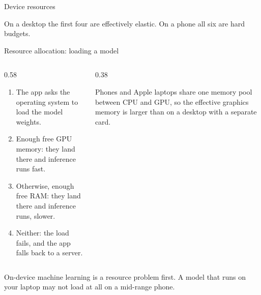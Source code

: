 \documentclass[10pt,aspectratio=169,t]{beamer}
\begin{document}
\begin{frame}[eyebrow=Device spectrum]{Device resources}
  \vskip 1mm
  \begin{grid}[3]
  \end{grid}
  \begin{takeaway}{On a desktop the first four are effectively elastic.}
    On a phone all six are hard budgets.
  \end{takeaway}
\end{frame}

\begin{frame}[eyebrow=Device spectrum]{Resource allocation: loading a model}
  \vskip 2mm
  \begin{columns}[T]
    \begin{column}{0.58\textwidth}
      \begin{enumerate}
        \item The app asks the operating system to load the model weights.
        \item Enough free GPU memory: they land there and inference runs fast.
        \item Otherwise, enough free RAM: they land there and inference runs, slower.
        \item Neither: the load fails, and the app falls back to a server.
      \end{enumerate}
    \end{column}
    \begin{column}{0.38\textwidth}
      \begin{hint}
        Phones and Apple laptops share one memory pool between CPU and GPU, so the effective graphics memory is larger than on a desktop with a separate card.
      \end{hint}
    \end{column}
  \end{columns}
  \begin{takeaway}{On-device machine learning is a resource problem first.}
    A model that runs on your laptop may not load at all on a mid-range phone.
  \end{takeaway}
\end{frame}
\end{document}
